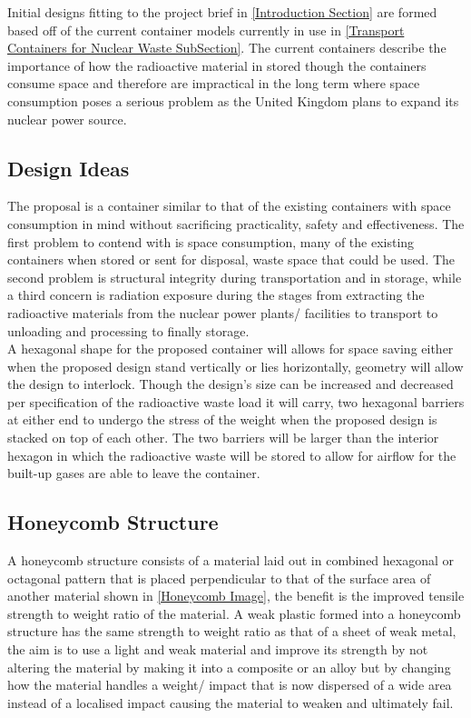 Initial designs fitting to the project brief in \cref{Introduction Section} are formed based off of the current container models currently in use in \cref{Transport Containers for Nuclear Waste SubSection}. The current containers describe the importance of how the radioactive material in stored though the containers consume space and therefore are impractical in the long term where space consumption poses a serious problem as the United Kingdom plans to expand its nuclear power source.
\subsection{Design Ideas}
\label{Design Ideas SubSection}

The proposal is a container similar to that of the existing containers with space consumption in mind without sacrificing practicality, safety and effectiveness. The first problem to contend with is space consumption, many of the existing containers when stored or sent for disposal, waste space that could be used. The second problem is structural integrity during transportation and in storage, while a third concern is radiation exposure during the stages from extracting the radioactive materials from the nuclear power plants/ facilities to transport to unloading and processing to finally storage. \\ 

A hexagonal shape for the proposed container will allows for space saving either when the proposed design stand vertically or lies horizontally, geometry will allow the design to interlock. Though the design's size can be increased and decreased per specification of the radioactive waste load it will carry, two hexagonal barriers at either end to undergo the stress of the weight when the proposed design is stacked on top of each other. The two barriers will be larger than the interior hexagon in which the radioactive waste will be stored to allow for airflow for the built-up gases are able to leave the container.

\subsection*{Honeycomb Structure}
\label{Honeycomb Structure SubSection}

A honeycomb structure consists of a material laid out in combined hexagonal or octagonal pattern that is placed perpendicular to that of the surface area of another material shown in \cref{Honeycomb Image}, the benefit is the improved tensile strength to weight ratio of the material. A weak plastic formed into a honeycomb structure has the same strength to weight ratio as that of a sheet of weak metal, the aim is to use a light and weak material and improve its strength by not altering the material by making it into a composite or an alloy but by changing how the material handles a weight/ impact that is now dispersed of a wide area instead of a localised impact causing the material to weaken and ultimately fail. \\

